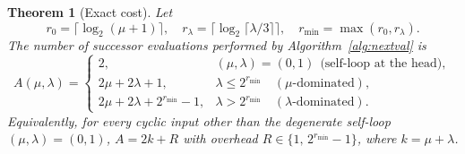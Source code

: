 \documentclass[11pt]{article}
\newtheorem{theorem}{Theorem}[section]
\begin{document}
\begin{theorem}[Exact cost]
\label{thm:closed-form}
Let
\[
r_0=\lceil\log_2(\mu+1)\rceil,\quad
r_\lambda=\lceil\log_2\lceil\lambda/3\rceil\rceil,\quad
r_{\min}=\max(r_0,r_\lambda).
\]
The number of successor evaluations performed by Algorithm~\ref{alg:nextval} is
\[
A(\mu,\lambda)=\begin{cases}
2, & (\mu,\lambda)=(0,1)\ \ \text{(self-loop at the head)},\\[2pt]
2\mu+2\lambda+1, & \lambda\le 2^{r_{\min}}\quad(\mu\text{-dominated}),\\[2pt]
2\mu+2\lambda+2^{r_{\min}}-1, & \lambda> 2^{r_{\min}}\quad(\lambda\text{-dominated}).
\end{cases}
\]
Equivalently, for every cyclic input other than the degenerate self-loop
$(\mu,\lambda)=(0,1)$, $A=2k+R$ with overhead $R\in\{1,\,2^{r_{\min}}-1\}$, where
$k=\mu+\lambda$.
\end{theorem}
\end{document}
